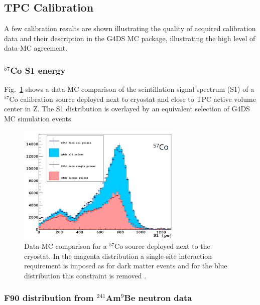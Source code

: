 \subsection{TPC Calibration}
A few calibration results are shown illustrating the quality of acquired calibration data and their description in the G4DS MC package, illustrating the high level of data-MC agreement.

\subsubsection{$^{57}$Co S1 energy}
Fig.~\ref{fig:CalibData:Co57} shows a data-MC comparison of the scintillation signal spectrum (S1) of a $^{57}$Co calibration source deployed next to cryostat and close to TPC active volume center in Z. The S1 distribution is overlayed by an equivalent selection of G4DS MC simulation events.

\begin{figure}[htbp]
\centering
\includegraphics[width=0.7\textwidth]{./Figures/57Co_Paolo_G4DS_UCLA.png}
\caption{Data-MC comparison for a $^{57}$Co source deployed next to the cryostat. In the magenta distribution a single-site interaction requirement is imposed as for dark matter events and for the blue distribution this constraint is removed \cite{DS50:G4DS:paper}.
\label{fig:CalibData:Co57}}
 \end{figure}


\subsubsection{F90 distribution from $^{241}$Am$^9$Be neutron data}\label{sec:CalibData:NR}

